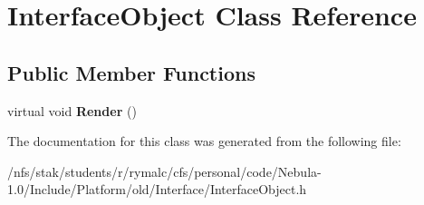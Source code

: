 \hypertarget{classInterfaceObject}{
\section{InterfaceObject Class Reference}
\label{classInterfaceObject}
}
\subsection*{Public Member Functions}
\begin{DoxyCompactItemize}
\item 
\hypertarget{classInterfaceObject_af6d1e4e5fe4589b0a90db81deaeea9e7}{
virtual void {\bfseries Render} ()}
\label{classInterfaceObject_af6d1e4e5fe4589b0a90db81deaeea9e7}

\end{DoxyCompactItemize}


The documentation for this class was generated from the following file:\begin{DoxyCompactItemize}
\item 
/nfs/stak/students/r/rymalc/cfs/personal/code/Nebula-\/1.0/Include/Platform/old/Interface/InterfaceObject.h\end{DoxyCompactItemize}
